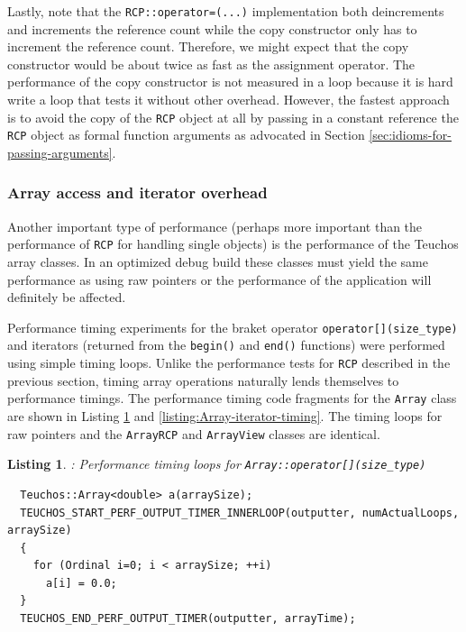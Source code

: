 \documentclass[pdf,ps2pdf,11pt]{SANDreport}
\newtheorem{listing}{Listing}
\begin{document}
Lastly, note that the {}\texttt{RCP::operator=(...)} implementation
both deincrements and increments the reference count while the copy
constructor only has to increment the reference count.  Therefore, we
might expect that the copy constructor would be about twice as fast as
the assignment operator.  The performance of the copy constructor is
not measured in a loop because it is hard write a loop that tests it
without other overhead.  However, the fastest approach is to avoid the
copy of the {}\texttt{RCP} object at all by passing in a constant
reference the {}\texttt{RCP} object as formal function arguments as
advocated in Section {}\ref{sec:idioms-for-passing-arguments}.


%
{}\subsubsection{Array access and iterator overhead}
\label{sec:array-overhead}
%

Another important type of performance (perhaps more important than the
performance of {}\texttt{RCP} for handling single objects) is the
performance of the Teuchos array classes.  In an optimized debug build
these classes must yield the same performance as using raw pointers or
the performance of the application will definitely be affected.

Performance timing experiments for the braket operator
{}\texttt{operator[](size\_type)} and iterators (returned from the
{}\texttt{begin()} and {}\texttt{end()} functions) were performed
using simple timing loops.  Unlike the performance tests for
{}\texttt{RCP} described in the previous section, timing array
operations naturally lends themselves to performance timings.  The
performance timing code fragments for the {}\texttt{Array} class are
shown in Listing {}\ref{listing:Array-bracket-timing} and
{}\ref{listing:Array-iterator-timing}.  The timing loops for raw
pointers and the {}\texttt{ArrayRCP} and {}\texttt{ArrayView} classes
are identical.


\begin{listing}: Performance timing loops for
{}\texttt{Array::operator[](size\_type)} \\
\label{listing:Array-bracket-timing}
{\small\begin{verbatim}
  Teuchos::Array<double> a(arraySize); 
  TEUCHOS_START_PERF_OUTPUT_TIMER_INNERLOOP(outputter, numActualLoops, arraySize) 
  { 
    for (Ordinal i=0; i < arraySize; ++i) 
      a[i] = 0.0; 
  }
  TEUCHOS_END_PERF_OUTPUT_TIMER(outputter, arrayTime); 
\end{verbatim}}
\end{listing}
\end{document}
